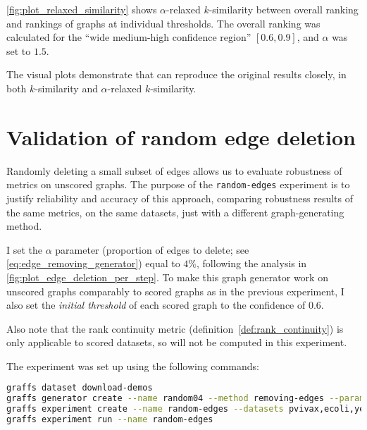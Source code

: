 \autoref{fig:plot_relaxed_similarity} shows $\alpha$-relaxed $k$-similarity between overall ranking and rankings of graphs at individual thresholds.
The overall ranking was calculated for the ``wide
medium-high confidence region'' $\left[ 0.6, 0.9 \right]$, and $\alpha$ was set to $1.5$.

The visual plots demonstrate that \graffs can reproduce the original results closely, in both $k$-similarity and $\alpha$-relaxed $k$-similarity.


\section{Validation of random edge deletion}



Randomly deleting a small subset of edges allows us to evaluate robustness of metrics on unscored graphs.
The purpose of the \texttt{random-edges} experiment is to justify reliability and accuracy of this approach, comparing robustness results of the same metrics, on the same datasets, just with a different graph-generating method.

I set the $\alpha$ parameter (proportion of edges to delete; see \autoref{eq:edge_removing_generator}) equal to $4\%$, following the analysis in \autoref{fig:plot_edge_deletion_per_step}.
To make this graph generator work on unscored graphs comparably to scored graphs as in the previous experiment, I also set the \textsl{initial threshold} of each scored graph to the confidence of $0.6$.

Also note that the rank continuity metric (definition~\ref{def:rank_continuity}) is only applicable to scored datasets, so will not be computed in this experiment.

The experiment was set up using the following commands:
\begin{lstlisting}[language=bash]
graffs dataset download-demos
graffs generator create --name random04 --method removing-edges --params 0.04,600 -n 31 --seed 7
graffs experiment create --name random-edges --datasets pvivax,ecoli,yeast --generator random04 --metrics Betweenness,Degree,Ego1Edges,Ego2Nodes,LocalClustering,PageRank,Redundancy --robustnessMeasures RankIdentifiability,RankInstability
graffs experiment run --name random-edges
\end{lstlisting}



